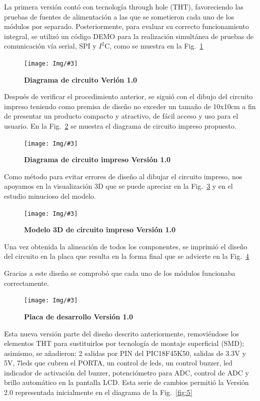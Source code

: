 \documentclass[times, 10pt,twocolumn]{article}
\newcommand{\Img}[5]{
   \begin{figure}[H]
   	   \centering
       \texttt{[image: Img/\#3]}
       \caption{ \centering \textbf{\small #4}}
       \label{#5}
   
       \end{figure}
   }
\begin{document}
La primera versión contó con tecnología through hole (THT), favoreciendo las pruebas de fuentes de alimentación a las que se sometieron cada uno de los módulos por separado. Posteriormente, para evaluar su correcto funcionamiento integral, se utilizó un
código DEMO para la realización simultánea de pruebas de comunicación vía serial, SPI y $I^{2}$C, como se muestra en la Fig.~\ref{fig:1}

\Img{7.5cm}{7.0cm}{Primera_Version.pdf}{Diagrama de circuito Verión 1.0}{fig:1}

Después de verificar el procedimiento anterior, se siguió con el dibujo del circuito impreso teniendo como premisa de diseño no exceder un tamaño de 10x10cm a fin de presentar un producto compacto y atractivo, de fácil acceso y uso para el usuario. En la Fig.~\ref{fig:2} se muestra el diagrama de circuito impreso propuesto.

\Img{8.5cm}{8.5cm}{primera_version_pcb}{Diagrama de circuito impreso Versión 1.0}{fig:2}
Como método para evitar errores de diseño al dibujar el circuito impreso, nos apoyamos en la visualización 3D que se puede apreciar en la Fig.~\ref{fig:3} y en el estudio minucioso del modelo.

\Img{8.5cm}{7.5cm}{primera_version_3d}{Modelo 3D de circuito impreso Versión 1.0}{fig:3} 

Una vez obtenida la alineación de todos los componentes, se imprimió el diseño del circuito en la placa que resulta en la forma final que se advierte en la Fig.~\ref{fig:4}

Gracias a este diseño se comprobó que cada uno de los módulos funcionaba correctamente.
\Img{8.5cm}{7.5cm}{primera_version_final}{Placa de desarrollo Versión 1.0}{fig:4} 



\vspace{-0.2cm}
Esta nueva versión parte del diseño descrito anteriormente, removiéndose los elementos THT para sustituirlos por tecnología de montaje superficial (SMD); asimismo, se añadieron: 2 salidas por PIN del PIC18F45K50, salidas de 3.3V y 5V, 7leds que cubren el PORTA, un control de leds, un control buzzer, led indicador de activación del buzzer, potenciómetro para ADC, control de ADC y brillo automático en la pantalla LCD. Esta serie de cambios permitió la Versión 2.0 representada inicialmente en el diagrama de la Fig.~\ref{fig:5}
\end{document}
